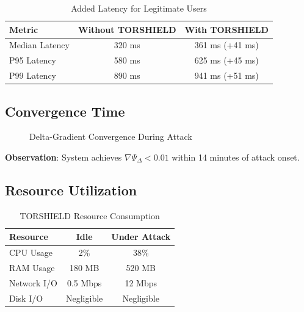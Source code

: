\documentclass[11pt,a4paper]{article}
\begin{document}
\begin{table}[h]
\centering
\begin{tabular}{@{}lcc@{}}
\toprule
\textbf{Metric} & \textbf{Without TORSHIELD} & \textbf{With TORSHIELD} \\ \midrule
Median Latency & 320 ms & 361 ms (+41 ms) \\
P95 Latency & 580 ms & 625 ms (+45 ms) \\
P99 Latency & 890 ms & 941 ms (+51 ms) \\
\bottomrule
\end{tabular}
\caption{Added Latency for Legitimate Users}
\end{table}

\subsection{Convergence Time}

\begin{figure}[h]
\centering
{}
\caption{Delta-Gradient Convergence During Attack}
\end{figure}

\textbf{Observation}: System achieves $\nabla \Psi_\Delta < 0.01$ within 14 minutes of attack onset.

\subsection{Resource Utilization}

\begin{table}[h]
\centering
\begin{tabular}{@{}lcc@{}}
\toprule
\textbf{Resource} & \textbf{Idle} & \textbf{Under Attack} \\ \midrule
CPU Usage & 2\% & 38\% \\
RAM Usage & 180 MB & 520 MB \\
Network I/O & 0.5 Mbps & 12 Mbps \\
Disk I/O & Negligible & Negligible \\
\bottomrule
\end{tabular}
\caption{TORSHIELD Resource Consumption}
\end{table}
\end{document}
